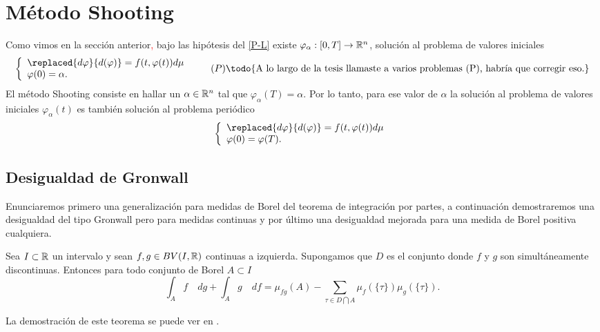 \section{Método Shooting }
Como vimos en la sección anterior\textcolor{red}{,} bajo las hipótesis del  \ref{P-L}  existe  $\varphi_\alpha:[0,T]\to \mathbb{R}^n$,  solución al problema de valores iniciales 
 \begin{equation}
	\left\lbrace \begin{array}{l}
		\replaced{d\varphi}{d(\varphi)}=f(t,\varphi(t))d\mu\\
		\varphi(0)=\alpha.
	\end{array}\right. \tag{${P}$}\textrm{\todo{A lo largo de la tesis llamaste a varios problemas (P), habría que corregir eso.}}
\end{equation}
El método Shooting consiste en hallar un $\alpha\in\mathbb{R}^n$ tal que $\varphi_\alpha(T)=\alpha$.  
Por lo tanto, para ese valor de $\alpha$ la solución al problema de valores iniciales  $\varphi_\alpha(t)$ es también solución al problema periódico 
 \begin{equation*}
	\left\lbrace \begin{array}{l}
		\replaced{d\varphi}{d(\varphi)}=f(t,\varphi(t))d\mu\\
		\varphi(0)=\varphi(T).
	\end{array}\right. 
\end{equation*}



\subsection{Desigualdad de Gronwall}
Enunciaremos primero una generalización para medidas de Borel del teorema de integración por partes, a continuación demostraremos una desigualdad del tipo Gronwall pero para medidas continuas y por último una desigualdad mejorada para una medida de Borel positiva cualquiera.


\begin{thm}\label{T Partes}
	Sea $I\subset\mathbb{R}$ un intervalo y sean $f,g\in BV(I,\mathbb{R})$ continuas a izquierda. Supongamos que $D$ es el conjunto donde $f$ y $g$ son simultáneamente  discontinuas. Entonces para todo conjunto de Borel $A\subset I$
	\begin{equation}\label{eq:Partes}
		\int_A f \quad dg+\int_Ag \quad df =\mu_{fg}(A)-\sum_{\tau\in D\bigcap A}\mu_{f}(\{\tau\})\mu_{g}(\{\tau\}).
	\end{equation}
\end{thm}
La demostración de este teorema se puede ver en \cite[Teorema 6.2.2]{Carter}.

